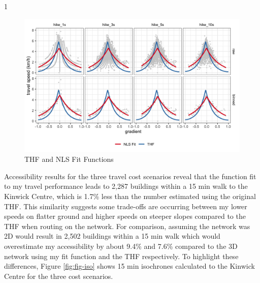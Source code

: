 \documentclass{article}
\begin{document}
\begin{table}[ht]
\begin{centerbox}
\begin{threeparttable}
\begin{tabularx}{1\textwidth}
 \tabularnewline[-0.5pt]


\hhline{}
\end{tabularx}
\end{threeparttable}\par\end{centerbox}

\end{table}
 

\begin{figure}[H]
\includegraphics[width=1\linewidth]{./img/Fig_2} \caption{THF and NLS Fit Functions}\label{fig:fig-fit}
\end{figure}

Accessibility results for the three travel cost scenarios reveal that
the function fit to my travel performance leads to 2,287 buildings
within a 15 min walk to the Kinwick Centre, which is 1.7\% less than the
number estimated using the original THF. This similarity suggests some
trade-offs are occurring between my lower speeds on flatter ground and
higher speeds on steeper slopes compared to the THF when routing on the
network. For comparison, assuming the network was 2D would result in
2,502 buildings within a 15 min walk which would overestimate my
accessibility by about 9.4\% and 7.6\% compared to the 3D network using
my fit function and the THF respectively. To highlight these
differences, Figure \ref{fig:fig-iso} shows 15 min isochrones calculated
to the Kinwick Centre for the three cost scenarios.
\end{document}
